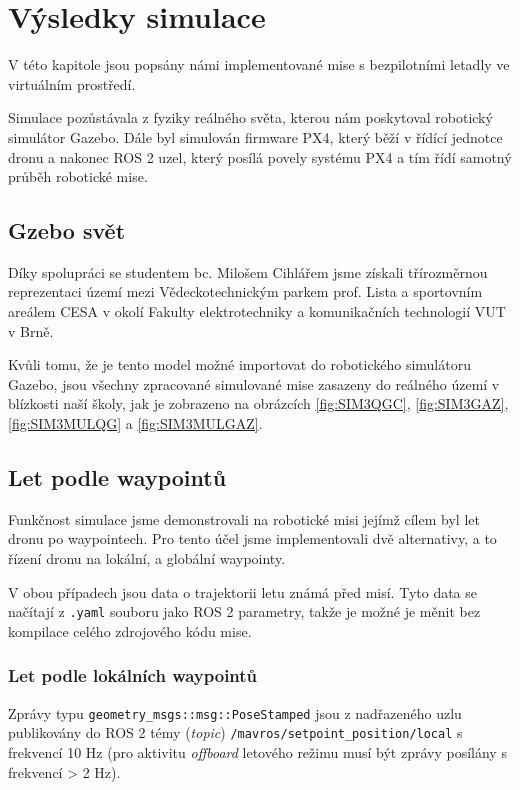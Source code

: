\chapter{Výsledky simulace}

V této kapitole jsou popsány námi implementované mise s bezpilotními letadly ve virtuálním prostředí. 

Simulace pozůstávala z fyziky reálného světa, kterou nám poskytoval robotický simulátor Gazebo. Dále byl simulován firmware PX4, který běží v řídící jednotce dronu a nakonec ROS 2 uzel, který posílá povely systému PX4 a tím řídí samotný průběh robotické mise.

\section{Gzebo svět}

Díky spolupráci se studentem bc. Milošem Cihlářem jsme získali třírozměrnou reprezentaci území mezi Vědeckotechnickým parkem prof. Lista a sportovním areálem CESA v okolí Fakulty elektrotechniky a komunikačních technologií VUT v Brně. 

Kvůli tomu, že je tento model možné importovat do robotického simulátoru Gazebo, jsou všechny zpracované simulované mise zasazeny do reálného území v blízkosti naší školy, jak je zobrazeno na obrázcích \ref{fig:SIM3QGC}, \ref{fig:SIM3GAZ}, \ref{fig:SIM3MULQG} a \ref{fig:SIM3MULGAZ}.

\section{Let podle waypointů}

Funkčnost simulace jsme demonstrovali na robotické misi jejímž cílem byl let dronu po waypointech. Pro tento účel jsme implementovali dvě alternativy, a to řízení dronu na lokální, a globální waypointy.

V obou případech jsou data o trajektorii letu známá před misí. Tyto data se načítají z \texttt{.yaml} souboru jako ROS 2 parametry, takže je možné je měnit bez kompilace celého zdrojového kódu mise. 

\subsection{Let podle lokálních waypointů}

Zprávy typu \texttt{geometry\_msgs::msg::PoseStamped} jsou z nadřazeného uzlu publikovány do ROS 2 témy (\textit{topic}) \texttt{/mavros/setpoint\_position/local} s frekvencí 10 Hz (pro aktivitu \textit{offboard} letového režimu musí být zprávy posílány s frekvencí > 2 Hz).


